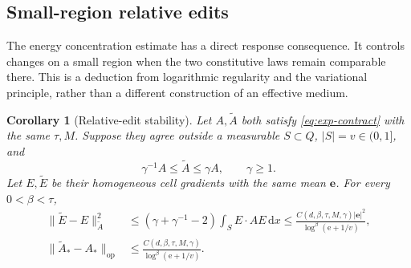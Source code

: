 \documentclass[11pt,a4paper]{article}
\numberwithin{equation}{section}
\newtheorem{corollary}[theorem]{Corollary}
\theoremstyle{definition}
\theoremstyle{remark}\newtheorem{remark}[theorem]{Remark}
\newcommand{\ee}{\mathrm e}
\newcommand{\dd}{\,\mathrm dx}
\newcommand{\norm}[1]{\lVert #1\rVert}
\newcommand{\op}{\mathrm{op}}
\newcommand{\evec}{\boldsymbol e}
\begin{document}
\subsection{Small-region relative edits}\label{subsec:response-stability}

The energy concentration estimate has a direct response consequence.
It controls changes on a small region when the two constitutive
laws remain comparable there. This is a deduction from logarithmic
regularity and the variational principle, rather than a different
construction of an effective medium.

\begin{corollary}[Relative-edit stability]\label{cor:response-stability}
Let \(A,\widetilde A\) both satisfy \eqref{eq:exp-contract}
with the same \(\tau,M\). Suppose they agree outside a measurable
\(S\subset Q\), \(|S|=v\in(0,1]\), and
\[
 \gamma^{-1}A\leq\widetilde A\leq\gamma A,\qquad \gamma\geq1.
\]
Let \(E,\widetilde E\) be their homogeneous cell gradients with
the same mean \(\evec\). For every \(0<\beta<\tau\),
\begin{align}
 \norm{\widetilde E-E}_{\widetilde A}^2
 &\leq(\gamma+\gamma^{-1}-2)\int_S E\cdot AE\dd
 \leq\frac{C(d,\beta,\tau,M,\gamma)|\evec|^2}
                     {\log^\beta(\ee+1/v)},\label{eq:edit-field}\\
 \norm{\widetilde A_*-A_*}_{\op}
 &\leq\frac{C(d,\beta,\tau,M,\gamma)}
                     {\log^\beta(\ee+1/v)}.\label{eq:edit-tensor}
\end{align}
\end{corollary}
\end{document}
